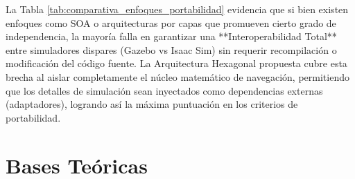 \begin{table}[h]
    \small
    \caption{\newline \textit{Comparativa de Enfoques Arquitectónicos para Portabilidad en Robótica con ROS 2}}
    \label{tab:comparativa_enfoques_portabilidad}
    \centering
\end{table}

La Tabla \ref{tab:comparativa_enfoques_portabilidad} evidencia que si bien existen enfoques como SOA o arquitecturas por capas que promueven cierto grado de independencia, la mayoría falla en garantizar una **Interoperabilidad Total** entre simuladores dispares (Gazebo vs Isaac Sim) sin requerir recompilación o modificación del código fuente. La Arquitectura Hexagonal propuesta cubre esta brecha al aislar completamente el núcleo matemático de navegación, permitiendo que los detalles de simulación sean inyectados como dependencias externas (adaptadores), logrando así la máxima puntuación en los criterios de portabilidad.

\section{Bases Teóricas}

